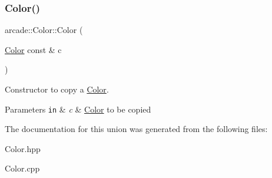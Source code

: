 \subsubsection{\texorpdfstring{Color()}{Color()}\hspace{0.1cm}{\footnotesize\ttfamily [3/3]}}
{\footnotesize\ttfamily arcade\+::\+Color\+::\+Color (\begin{DoxyParamCaption}\item[{\hyperlink{unionarcade_1_1Color}{Color} const \&}]{c }\end{DoxyParamCaption})}



Constructor to copy a \hyperlink{unionarcade_1_1Color}{Color}. 


\begin{DoxyParams}[1]{Parameters}
\mbox{\tt in}  & {\em c} & \hyperlink{unionarcade_1_1Color}{Color} to be copied \\
\hline
\end{DoxyParams}


The documentation for this union was generated from the following files\+:\begin{DoxyCompactItemize}
\item 
Color.\+hpp\item 
Color.\+cpp\end{DoxyCompactItemize}
